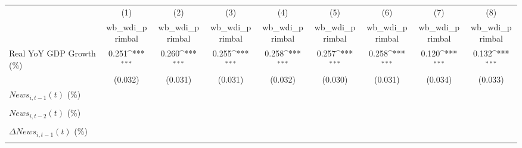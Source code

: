 {
\def\sym#1{\ifmmode^{#1}\else\(^{#1}\)\fi}
\begin{tabular}{l*{8}{c}}
\toprule
                    &\multicolumn{1}{c}{(1)}&\multicolumn{1}{c}{(2)}&\multicolumn{1}{c}{(3)}&\multicolumn{1}{c}{(4)}&\multicolumn{1}{c}{(5)}&\multicolumn{1}{c}{(6)}&\multicolumn{1}{c}{(7)}&\multicolumn{1}{c}{(8)}\\
                    &\multicolumn{1}{c}{wb_wdi_primbal}&\multicolumn{1}{c}{wb_wdi_primbal}&\multicolumn{1}{c}{wb_wdi_primbal}&\multicolumn{1}{c}{wb_wdi_primbal}&\multicolumn{1}{c}{wb_wdi_primbal}&\multicolumn{1}{c}{wb_wdi_primbal}&\multicolumn{1}{c}{wb_wdi_primbal}&\multicolumn{1}{c}{wb_wdi_primbal}\\
\midrule
Real YoY GDP Growth (\%)&       0.251\sym{***}&       0.260\sym{***}&       0.255\sym{***}&       0.258\sym{***}&       0.257\sym{***}&       0.258\sym{***}&       0.120\sym{***}&       0.132\sym{***}\\
                    &     (0.032)         &     (0.031)         &     (0.031)         &     (0.032)         &     (0.030)         &     (0.031)         &     (0.034)         &     (0.033)         \\
\addlinespace
$ News_{i,t-1}(t)$ (\%)&                     &                     &                     &                     &                     &                     &                     &                     \\
                    &                     &                     &                     &                     &                     &                     &                     &                     \\
\addlinespace
$ News_{i,t-2}(t)$ (\%)&                     &                     &                     &                     &                     &                     &                     &                     \\
                    &                     &                     &                     &                     &                     &                     &                     &                     \\
\addlinespace
$ \Delta News_{i,t-1}(t)$ (\%)&                     &                     &                     &                     &                     &                     &                     &                     \\
                    &                     &                     &                     &                     &                     &                     &                     &                     \\

\end{tabular}}
